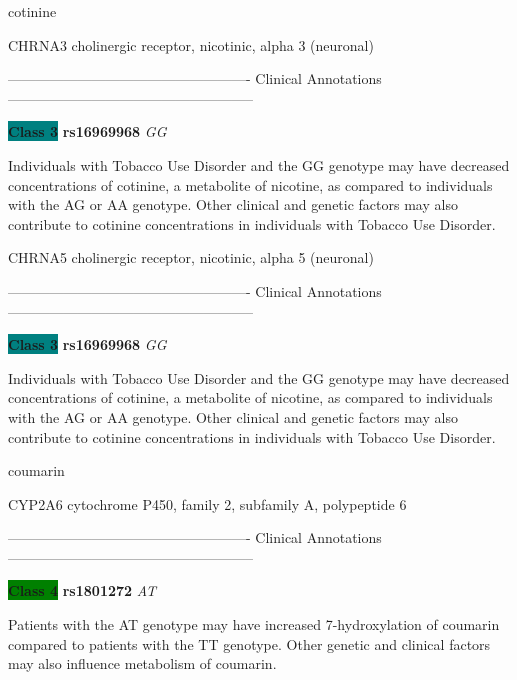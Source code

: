 \documentclass{resume} %
\begin{document}
\begin{rSection}{ cotinine }
\begin{rSubsection}{ CHRNA3 }{ cholinergic receptor, nicotinic, alpha 3 (neuronal) }{}{}
\item[] ---------------------------------------------------- Clinical Annotations -----------------------------------------------------\newline
\item \textbf{\colorbox{teal} {Class 3}} \textbf{ rs16969968 } \textit{ GG }
\item[] Individuals with Tobacco Use Disorder and the GG genotype may have decreased concentrations of cotinine, a metabolite of nicotine, as compared to individuals with the AG or AA genotype. Other clinical and genetic factors may also contribute to cotinine concentrations in individuals with Tobacco Use Disorder.
\end{rSubsection}\begin{rSubsection}{ CHRNA5 }{ cholinergic receptor, nicotinic, alpha 5 (neuronal) }{}{}
\item[]

\item[] ---------------------------------------------------- Clinical Annotations -----------------------------------------------------\newline
\item \textbf{\colorbox{teal} {Class 3}} \textbf{ rs16969968 } \textit{ GG }
\item[] Individuals with Tobacco Use Disorder and the GG genotype may have decreased concentrations of cotinine, a metabolite of nicotine, as compared to individuals with the AG or AA genotype. Other clinical and genetic factors may also contribute to cotinine concentrations in individuals with Tobacco Use Disorder.
\end{rSubsection}

\end{rSection}\begin{rSection}{ coumarin }
\item[]

\begin{rSubsection}{ CYP2A6 }{ cytochrome P450, family 2, subfamily A, polypeptide 6 }{}{}
\item[]

\item[] ---------------------------------------------------- Clinical Annotations -----------------------------------------------------\newline
\item \textbf{\colorbox{green} {Class 4}} \textbf{ rs1801272 } \textit{ AT }
\item[] Patients with the AT genotype may have increased 7-hydroxylation of coumarin compared to patients with the TT genotype. Other genetic and clinical factors may also influence metabolism of coumarin.
\end{rSubsection}


\end{rSection}
\end{document}
